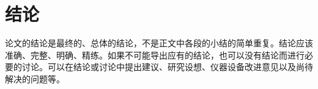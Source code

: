 \setlength{\baselineskip}{20pt}

\chapter{结论}
\label{cha:chap5}

论文的结论是最终的、总体的结论，不是正文中各段的小结的简单重复。结论应该准确、完整、明确、精练。如果不可能导出应有的结论，也可以没有结论而进行必要的讨论。可以在结论或讨论中提出建议、研究设想、仪器设备改进意见以及尚待解决的问题等。